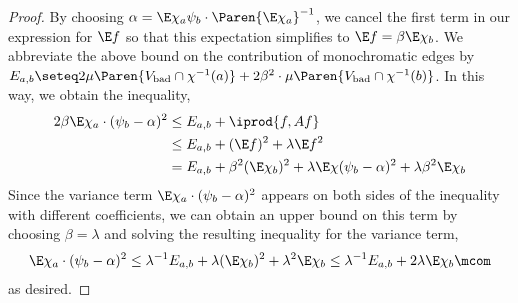 \begin{proof}
  By choosing \(\alpha=\E\chi_{a}\psi_{b} \cdot \Paren{\E \chi_{a}}^{-1}\), we cancel the first term in our expression for \(\E f\) so that this expectation simplifies to \(\E f=\beta \E \chi_{b}\).
  We abbreviate the above bound on the contribution of monochromatic edges by \(E_{a,b}\seteq 2 \mu\Paren{\Vbad \cap \chi^{-1}(a)} + 2 \beta^{2} \cdot \mu\Paren{\Vbad\cap \chi^{-1}(b)} \).
  In this way, we obtain the inequality,
  \begin{align}
    2\beta \E \chi_{a} \cdot(\psi_{b}-\alpha)^{2}
    & \le E_{a,b} + \iprod{f,Af} \\
    & \le E_{a,b} +  (\E f)^{2} + \lambda \E f^{2} \\
    & =   E_{a,b} + \beta^{2} (\E \chi_{b})^{2} + \lambda \E \chi (\psi_{b}-\alpha)^{2} + \lambda \beta^{2} \E \chi_{b}
  \end{align}
  Since the variance term \(\E \chi_{a} \cdot (\psi_{b}-\alpha)^{2}\) appears on both sides of the inequality with different coefficients, we can obtain an upper bound on this term by choosing \(\beta=\lambda\) and solving the resulting inequality for the variance term,
  \begin{equation}
    \E \chi_{a} \cdot(\psi_{b}-\alpha)^{2}
    \le \lambda^{-1} E_{a,b} + \lambda (\E \chi_{b})^{2} + \lambda^{2} \E\chi_{b}
    \le\lambda^{-1} E_{a,b} + 2\lambda \E\chi_{b}
    \mcom
  \end{equation}
  as desired.
\end{proof}


